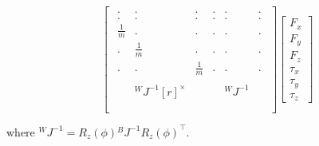\documentclass{article}
\begin{document}
\begin{equation}
\begin{bmatrix}
\begin{array}{cccccc}
		. & . & . & . & . & . \\
		. & . & . & . & . & . \\
		\frac{1}{m} & . & . & . & . & . \\
		. & \frac{1}{m} & . & . & . & . \\
		. & . & \frac{1}{m} & . & . & . \\
		  &   &   &   &   &   \\
		  & {}^WJ^{-1} [r]^\times &   &   &  {}^WJ^{-1} &   \\
		  &   &   &   &   &   \\
	\end{array}
	\end{bmatrix}
	\begin{bmatrix}
	F_x\\
	F_y\\
	F_z\\
	\tau_x \\
	\tau_y \\
	\tau_z
	\end{bmatrix}
\end{equation}

where $ {}^WJ^{-1} = R_z(\phi){}^BJ^{-1}R_z(\phi)^\top $. \\
\linebreak
\end{document}
